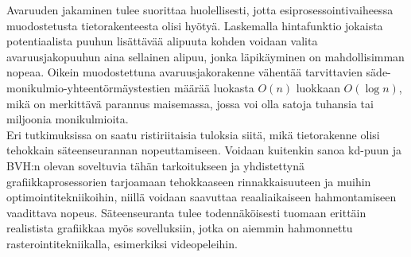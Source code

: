 \documentclass[a4paper, 12pt, titlepage]{article}
\begin{document}
Avaruuden jakaminen tulee suorittaa huolellisesti, jotta esiprosessointivaiheessa muodostetusta tietorakenteesta olisi hyötyä. Laskemalla hintafunktio jokaista potentiaalista puuhun lisättävää alipuuta kohden voidaan valita avaruusjakopuuhun aina sellainen alipuu, jonka läpikäyminen on mahdollisimman nopeaa. Oikein muodostettuna avaruusjakorakenne vähentää tarvittavien säde-monikulmio-yhteentörmäystestien määrää luokasta $O(n)$ luokkaan $O(\log n)$, mikä on merkittävä parannus maisemassa, jossa voi olla satoja tuhansia tai miljoonia monikulmioita. \\

Eri tutkimuksissa on saatu ristiriitaisia tuloksia siitä, mikä tietorakenne olisi tehokkain säteenseurannan nopeuttamiseen. Voidaan kuitenkin sanoa kd-puun ja BVH:n olevan soveltuvia tähän tarkoitukseen ja yhdistettynä grafiikkaprosessorien tarjoamaan tehokkaaseen rinnakkaisuuteen ja muihin optimointitekniikoihin, niillä voidaan saavuttaa reaaliaikaiseen hahmontamiseen vaadittava nopeus. Säteenseuranta tulee todennäköisesti tuomaan erittäin realistista grafiikkaa myös sovelluksiin, jotka on aiemmin hahmonnettu rasterointitekniikalla, esimerkiksi videopeleihin. \\


\clearpage

\clearpage
\end{document}
